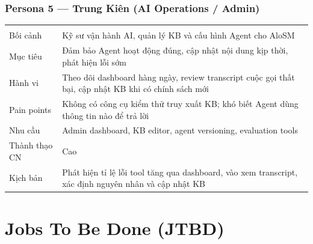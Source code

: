 \documentclass[12pt,a4paper]{article}
\begin{document}
\subsubsection{Persona 5 --- Trung Kiên (AI Operations / Admin)}

\begin{longtable}{L{3.5cm} L{10cm}}
  \toprule{}\\
  \midrule\endfirsthead\toprule{}\\\midrule\endhead\bottomrule\endlastfoot
  Bối cảnh & Kỹ sư vận hành AI, quản lý KB và cấu hình Agent cho AloSM \\
  Mục tiêu & Đảm bảo Agent hoạt động đúng, cập nhật nội dung kịp thời, phát hiện lỗi sớm \\
  Hành vi & Theo dõi dashboard hàng ngày, review transcript cuộc gọi thất bại, cập nhật KB khi có chính sách mới \\
  Pain points & Không có công cụ kiểm thử truy xuất KB; khó biết Agent dùng thông tin nào để trả lời \\
  Nhu cầu & Admin dashboard, KB editor, agent versioning, evaluation tools \\
  Thành thạo CN & Cao \\
  Kịch bản & Phát hiện tỉ lệ lỗi tool tăng qua dashboard, vào xem transcript, xác định nguyên nhân và cập nhật KB \\
\end{longtable}

\section{Jobs To Be Done (JTBD)}
\end{document}
